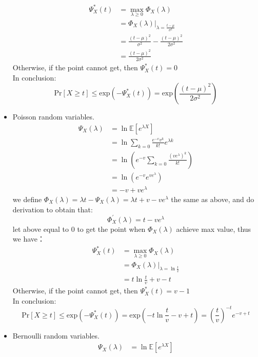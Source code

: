 \documentclass[12pt]{article}
\newenvironment{solution}[2][Solution]{\begin{trivlist}
\item[\hskip \labelsep {\bfseries #1}\hskip \labelsep {\bfseries #2.}]}{\end{trivlist}}
\begin{document}
\begin{solution}{2}
\begin{itemize}
        \begin{align*}
            \Psi_X^*(t) & = \max_{\lambda \ge 0}\Phi_X(\lambda) \\
            & = \Phi_X(\lambda)|_{\lambda=\frac{t-\mu}{\sigma^2}} \\
            & = \frac{(t-\mu)^2}{\sigma^2} - \frac{(t-\mu)^2}{2 \sigma^2} \\
            & = \frac{(t-\mu)^2}{2 \sigma^2}
        \end{align*}
        Otherwise, if the point cannot get, then $\Psi_X^*(t)=0$ \\
        In conclusion:
        \[\mathrm{Pr}[X \ge t] \le \mathrm{exp}({-\Psi_X^*(t)}) = \mathrm{exp}({\frac{(t-\mu)^2}{2 \sigma^2}})\]

        \item Poisson random variables.
        \begin{align*}
            \Psi_X(\lambda) & = \ln \mathbb{E}[e^{\lambda X}] \\
            & = \ln \sum_{k=0} \frac{e^{- v} v^k}{k!}e^{\lambda k} \\
            & = \ln(e^{-v}\sum_{k=0}\frac{(ve^\lambda)^k}{k!}) \\
            & = \ln(e^{-v}e^{ve^\lambda}) \\
            & = -v + ve^\lambda
        \end{align*}
        we define $\Phi_X(\lambda) = \lambda t - \Psi_X(\lambda) = \lambda t + v - ve^\lambda$ the same as above, and do derivation to obtain that:
        \[\Phi_X^{\prime}(\lambda) = t - ve^\lambda\]
        let above equal to 0 to get the point when $\Phi_X(\lambda)$ achieve max value, thus we have：
        \begin{align*}
            \Psi_X^*(t) & = \max_{\lambda \ge 0}\Phi_X(\lambda) \\
            & = \Phi_X(\lambda)|_{\lambda=\ln \frac{t}{v}} \\
            & = t \ln \frac{t}{v} + v -t
        \end{align*}
        Otherwise, if the point cannot get, then $\Psi_X^*(t)=v-1$ \\
        In conclusion:
        \[\mathrm{Pr}[X \ge t] \le \mathrm{exp}({-\Psi_X^*(t)}) = \mathrm{exp}(-t \ln \frac{t}{v} - v + t) = (\frac{t}{v})^{-t}e^{-v+t}\]
        \item Bernoulli random variables.
        \begin{align*}
            \Psi_X(\lambda) & = \ln \mathbb{E}[e^{\lambda X}] \\

\end{align*}
\end{itemize}
\end{solution}
\end{document}
